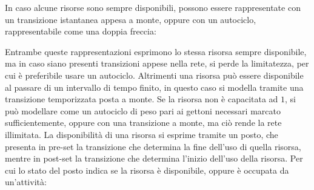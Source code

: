 \documentclass{article}
\numberwithin{equation}{subsection}
\begin{document}
In caso alcune risorse sono sempre disponibili, possono essere rappresentate con un transizione istantanea appesa a monte, oppure con un autociclo, rappresentabile come una 
doppia freccia: 
\begin{center}
\end{center}

Entrambe queste rappresentazioni esprimono lo stessa risorsa sempre disponibile, ma in caso siano presenti transizioni appese nella rete, si perde la limitatezza, per cui è 
preferibile usare un autociclo. Altrimenti una risorsa può essere disponibile al passare di un intervallo di tempo finito, in questo caso si modella tramite una 
transizione temporizzata posta a monte. Se la risorsa non è capacitata ad $1$, si può modellare come un autociclo di peso pari ai gettoni necessari marcato sufficientemente, 
oppure con una transizione a monte, ma ciò rende la rete illimitata. La disponibilità di una risorsa si esprime tramite un posto, che presenta in pre-set la transizione che 
determina la fine dell'uso di quella risorsa, mentre in post-set la transizione che determina l'inizio dell'uso della risorsa. Per cui lo stato del posto indica se la risorsa 
è disponibile, oppure è occupata da un'attività:
\begin{center}
\end{center}
\end{document}
